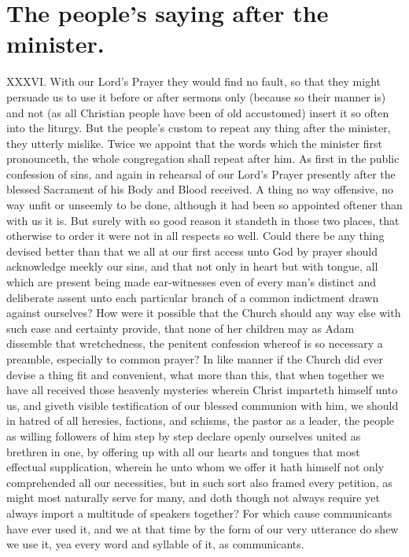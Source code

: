 \section*{The people’s saying after the minister.}
XXXVI. With our Lord’s Prayer they would find no fault, so that they might persuade us to use it before or after sermons only (because so their manner is) and not (as all Christian people have been of old accustomed) insert it so often into the liturgy. But the people’s custom to repeat any thing after the minister, they utterly mislike. Twice we appoint that the words which the minister first pronounceth, the whole congregation shall repeat after him. As first in the public confession of sins, and again in rehearsal of our Lord’s Prayer presently after the blessed Sacrament of his  Body and Blood received. A thing no way offensive, no way unfit or unseemly to be done, although it had been so appointed oftener than with us it is. But surely with so good reason it standeth in those two places, that otherwise to order it were not in all respects so well.
Could there be any thing devised better than that we all at our first access unto God by prayer should acknowledge meekly our sins, and that not only in heart but with tongue, all which are present being made ear-witnesses even of every man’s distinct and deliberate assent unto each particular branch of a common indictment drawn against ourselves? How were it possible that the Church should any way else with such ease and certainty provide, that none of her children may as Adam dissemble that wretchedness, the penitent confession whereof is so necessary a preamble, especially to common prayer?
In like manner if the Church did ever devise a thing fit and convenient, what more than this, that when together we have all received those heavenly mysteries wherein Christ imparteth himself unto us, and giveth visible testification of our blessed communion with him, we should in hatred of all heresies, factions, and schisms, the pastor as a leader, the people as willing followers of him step by step declare openly ourselves united as brethren in one, by offering up with all our hearts and tongues that most effectual supplication, wherein he unto whom we offer it hath himself not only comprehended all our necessities, but in such sort also framed every petition, as might most naturally serve for many, and doth though not always require yet always import a multitude of speakers together? For which cause communicants have ever used it, and we at that time by the form of our very utterance do shew we use it, yea every word and syllable of it, as communicants.
